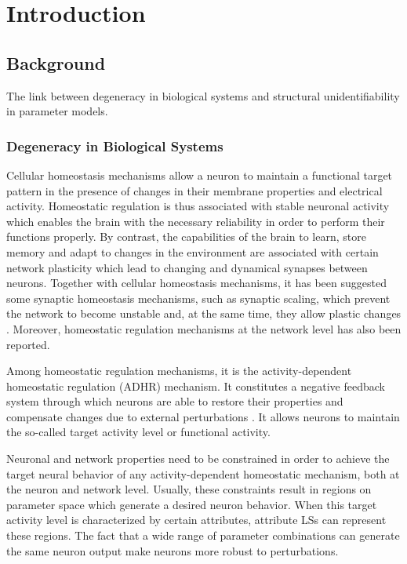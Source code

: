 \chapter{Introduction}
\label{sec:in}

\section{Background}
The link between degeneracy in biological systems and structural unidentifiability in parameter models.

\subsection{Degeneracy in Biological Systems}
Cellular homeostasis mechanisms allow a neuron to maintain a functional target pattern in the presence of changes in their membrane properties and electrical activity. Homeostatic regulation is thus associated with stable neuronal activity which enables the brain with the necessary reliability  in order to perform their functions properly. By contrast, the capabilities of the brain to learn, store memory and adapt to changes in the environment are associated with certain network plasticity which lead to changing and dynamical synapses between neurons. Together with cellular homeostasis mechanisms, it has been suggested some synaptic homeostasis mechanisms, such as synaptic scaling, which prevent the network to become unstable and, at the same time, they allow plastic changes \cite{Astrid}. Moreover, homeostatic regulation mechanisms at the network level has also been reported. 

Among homeostatic regulation mechanisms, it is the activity-dependent homeostatic regulation (ADHR) mechanism. It constitutes a negative feedback system through which neurons are able to restore their properties and compensate changes due to external perturbations \cite{Astrid}. It allows neurons to maintain the so-called target activity level or functional activity.

Neuronal and network properties need to be constrained in order to achieve the target neural behavior of any activity-dependent homeostatic mechanism, both at the neuron and network level. Usually, these constraints result in regions on parameter space which generate a desired neuron behavior. When this target activity level is characterized by certain attributes, attribute LSs can represent these regions. The fact that a wide range of parameter combinations can generate the same neuron output make neurons more robust to perturbations.

